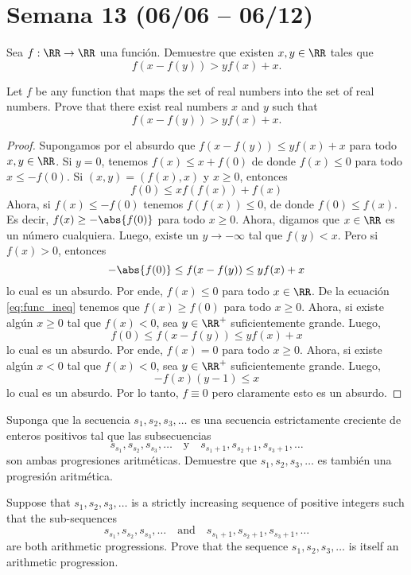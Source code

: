 \section{Semana 13 (06/06 -- 06/12)}


\begin{probMB}[ISL 2009/A5]
  Sea $f:\RR\to\RR$ una función. Demuestre que existen $x,y\in\RR$ tales que
  \[f(x-f(y))>yf(x)+x.\]
  \begin{hint}
    Let $f$ be any function that maps the set of real numbers into the set of
    real numbers. Prove that there exist real numbers $x$ and $y$ such that
    \[f(x-f(y))>yf(x)+x.\]
  \end{hint}
\end{probMB}

\begin{proof}
  Supongamos por el absurdo que $f(x-f(y))\le yf(x)+x$ para todo $x,y\in\RR$. Si
  $y=0$, tenemos $f(x)\le x+f(0)$ de donde $f(x)\le 0$ para todo $x\le -f(0)$.
  Si $(x,y)=(f(x),x)$ y $x\ge 0$, entonces
  \begin{equation}\label{eq:func_ineq}
    f(0)\le xf(f(x))+f(x)
  \end{equation}
  Ahora, si $f(x)\le -f(0)$ tenemos $f(f(x))\le 0$, de donde $f(0)\le f(x)$. Es
  decir, $f(x)\ge-\abs{f(0)}$ para todo $x\ge 0$. Ahora, digamos que $x\in\RR$
  es un número cualquiera. Luego, existe un $y\to-\infty$ tal que $f(y)<x$. Pero
  si $f(x)>0$, entonces
  \[-\abs{f(0)}\le f(x-f(y))\le yf(x)+x\]
  lo cual es un absurdo. Por ende, $f(x)\le 0$ para todo $x\in\RR$. De la
  ecuación \eqref{eq:func_ineq} tenemos que $f(x)\ge f(0)$ para todo $x\ge 0$.
  Ahora, si existe algún $x\ge 0$ tal que $f(x)<0$, sea $y\in\RR^+$
  suficientemente grande. Luego,
  \[f(0)\le f(x-f(y))\le yf(x)+x\]
  lo cual es un absurdo. Por ende, $f(x)=0$ para todo $x\ge 0$. Ahora, si existe
  algún $x<0$ tal que $f(x)<0$, sea $y\in\RR^+$ suficientemente grande. Luego,
  \[-f(x)(y-1)\le x\]
  lo cual es un absurdo. Por lo tanto, $f\equiv 0$ pero claramente esto es un
  absurdo.
\end{proof}

\begin{probMB}[ISL 2009/A6]
  Suponga que la secuencia $s_1,s_2,s_3,\dots$ es una secuencia estrictamente
  creciente de enteros positivos tal que las subsecuencias
  \[
    s_{s_1},s_{s_2},s_{s_3},\dots\quad\text{y}\quad
    s_{s_1+1},s_{s_2+1},s_{s_3+1},\dots
  \]
  son ambas progresiones aritméticas. Demuestre que $s_1,s_2,s_3,\dots$ es
  también una progresión aritmética.
  \begin{hint}
    Suppose that $s_1,s_2,s_3,\dots$ is a strictly increasing sequence of
    positive integers such that the sub-sequences
    \[
      s_{s_1},s_{s_2},s_{s_3},\dots\quad\text{and}\quad
      s_{s_1+1},s_{s_2+1},s_{s_3+1},\dots
    \]
    are both arithmetic progressions. Prove that the sequence
    $s_1,s_2,s_3,\dots$ is itself an arithmetic progression.
  \end{hint}
\end{probMB}


